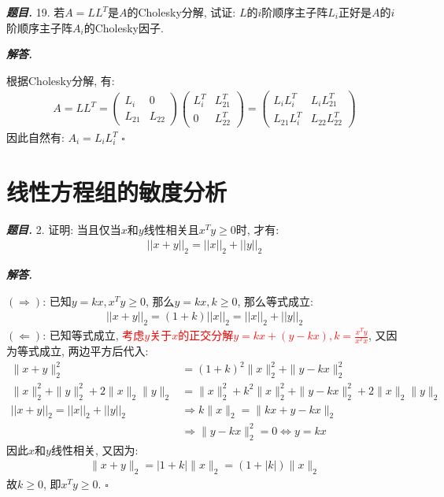 \documentclass[10pt, a4paper, oneside]{ctexart}
\newcommand{\norm}[1]{\| #1 \|}
\newenvironment{problem}{\begin{framed}\par\noindent\textbf{\textit{题目. }}}{\end{framed}\par}
\newenvironment{solution}{%
  \par\noindent\textbf{\textit{解答. }}\ignorespaces
}{%
  \hfill\ensuremath{\square}\par %
}
\begin{document}
\begin{problem}
19. 若$A=LL^T$是$A$的Cholesky分解, 试证: $L$的$i$阶顺序主子阵$L_i$正好是$A$的$i$阶顺序主子阵$A_i$的Cholesky因子.
\end{problem}

\begin{solution}
根据Cholesky分解, 有:
\begin{align*}
    A = LL^T = \begin{pmatrix}
        L_i & 0\\ L_{21} & L_{22}
    \end{pmatrix} \begin{pmatrix}
        L_i^T & L_{21}^T\\ 0 & L_{22}^T
    \end{pmatrix}=\begin{pmatrix}
        L_iL_i^T & L_i L_{21}^T \\ L_{21}L_i^T & L_{22}L_{22}^T
    \end{pmatrix}
\end{align*}
因此自然有: $A_i = L_i L_i^T$
\end{solution}

\section{线性方程组的敏度分析}

\begin{problem}
2. 证明: 当且仅当$x$和$y$线性相关且$x^Ty\geq 0$时, 才有:
\begin{align*}
    || x+y||_2 = ||x||_2+||y||_2
\end{align*}
\end{problem}

\begin{solution}
$(\Rightarrow)$: 已知$y=kx, x^Ty\geq 0$, 那么$y=kx, k\geq 0$, 那么等式成立:
\begin{align*}
    ||x+y||_2=(1+k)||x||_2=||x||_2+||y||_2
\end{align*}
$(\Leftarrow)$: 已知等式成立, \textcolor{red}{考虑$y$关于$x$的正交分解$y=kx+(y-kx), k=\frac{x^Ty}{x^Tx} $}, 又因为等式成立, 两边平方后代入:
\begin{align*}
    \norm{x+y}_2^2&=(1+k)^2\norm{x}_2^2+\norm{y-kx}_2^2\\
    \norm{x}_2^2+\norm{y}_2^2+2\norm{x}_2\norm{y}_2&=\norm{x}_2^2+k^2\norm{x}_2^2+\norm{y-kx}_2^2+2\norm{x}_2\norm{y}_2\\
    || x+y||_2 = ||x||_2+||y||_2&\Rightarrow k\norm{x}_2=\norm{kx+y-kx}_2\\
    &\Rightarrow \norm{y-kx}_2^2=0\iff y=kx
\end{align*}
因此$x$和$y$线性相关, 又因为:
\begin{align*}
    \norm{x+y}_2=|1+k|\norm{x}_2=(1+|k|)\norm{x}_2
\end{align*}
故$k\geq 0$, 即$x^Ty\geq 0$.
\end{solution}
\end{document}
